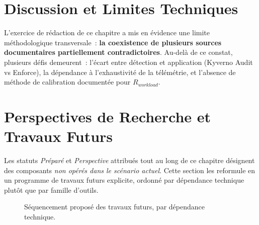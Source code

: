 \section{Discussion et Limites Techniques}

L'exercice de rédaction de ce chapitre a mis en évidence une limite méthodologique transversale~: \textbf{la coexistence de plusieurs sources documentaires partiellement contradictoires}. Au-delà de ce constat, plusieurs défis demeurent~: l'écart entre détection et application (Kyverno Audit vs Enforce), la dépendance à l'exhaustivité de la télémétrie, et l'absence de méthode de calibration documentée pour $R_{workload}$.

\section{Perspectives de Recherche et Travaux Futurs}
\label{sec:travaux_futurs}

Les statuts \textit{Préparé} et \textit{Perspective} attribués tout au long de ce chapitre désignent des composants \emph{non opérés dans le scénario actuel}. Cette section les reformule en un programme de travaux futurs explicite, ordonné par dépendance technique plutôt que par famille d'outils.

\begin{figure}[htbp]
\centering
\scriptsize
{}
\caption{Séquencement proposé des travaux futurs, par dépendance technique.}
\label{fig:sequencement_travaux_futurs}
\end{figure}

